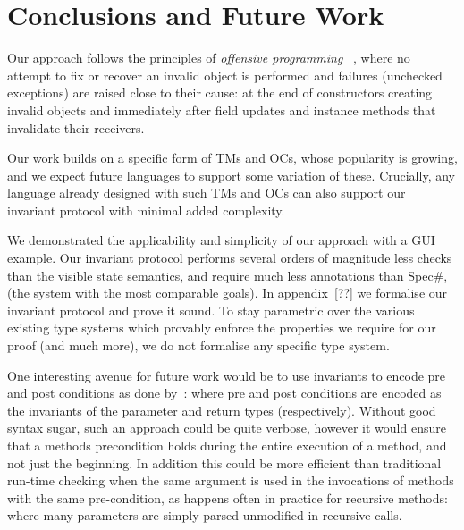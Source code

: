 \section{Conclusions and Future Work}
Our approach follows the principles of \emph{offensive programming}
~\cite{stephens2015beginning}, where 
no attempt to fix or recover an invalid object is performed and
 failures (unchecked exceptions)
		are raised close to their cause: at the end of constructors creating invalid objects and immediately after field updates and instance methods that invalidate their receivers.



Our work builds on a specific form of TMs and OCs, whose
popularity is growing, and we expect future languages to support some variation of these.
Crucially, any language already designed with such TMs and OCs
can also support our invariant protocol with minimal added complexity.


We demonstrated the applicability and simplicity of our approach with a GUI example.
Our invariant protocol performs several orders of magnitude less checks than the visible state semantics, and require much less annotations 
than Spec\#, (the system with the most comparable goals).
In appendix~\ref{??} we formalise our invariant protocol and prove it sound. To stay parametric over the various existing type systems which provably enforce the properties we require for our proof (and much more), we do not formalise any specific type system.


One interesting avenue for future work would be to
use invariants to encode pre and post conditions
as done by~\cite{Flanagan06hybridtypes}: where pre and post conditions are encoded as the invariants of the parameter and return types (respectively).
Without good syntax sugar, such an approach could be quite verbose, however it would ensure that a methods precondition holds during the entire execution of a method, and not just the beginning. In addition this could be more efficient than traditional run-time checking when the same argument is used in the invocations of methods with the same pre-condition, as happens often in practice for recursive methods: where many parameters are simply parsed unmodified in recursive calls.

